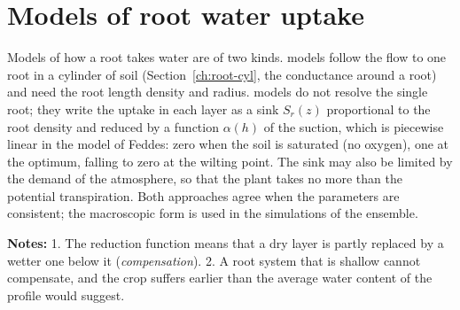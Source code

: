 \section{Models of root water uptake}
Models of how a root takes water are of two kinds.  models follow the flow to one root in a cylinder of soil (Section~\ref{ch:root-cyl}, the conductance around a root) and need the root length density and radius.  models do not resolve the single root; they write the uptake in each layer as a sink $S_r(z)$ proportional to the root density and reduced by a function $\alpha(h)$ of the suction, which is piecewise linear in the model of Feddes: zero when the soil is saturated (no oxygen), one at the optimum, falling to zero at the wilting point. The sink may also be limited by the demand of the atmosphere, so that the plant takes no more than the potential transpiration. Both approaches agree when the parameters are consistent; the macroscopic form is used in the simulations of the ensemble.
\par\noindent \textbf{Notes:} 1. The reduction function means that a dry layer is partly replaced by a wetter one below it (\emph{compensation}). 2. A root system that is shallow cannot compensate, and the crop suffers earlier than the average water content of the profile would suggest.
